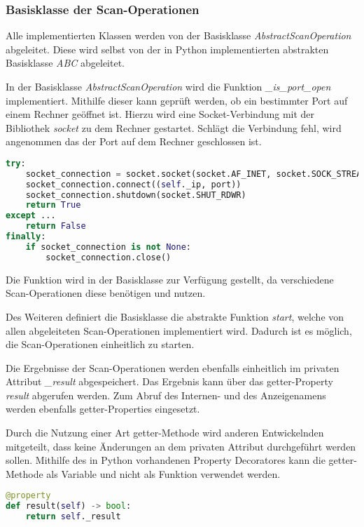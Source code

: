 \subsubsection{Basisklasse der Scan-Operationen}

Alle implementierten Klassen werden von der Basisklasse \textit{AbstractScanOperation} abgeleitet. Diese wird selbst von der in Python implementierten abstrakten Basisklasse \textit{ABC} abgeleitet.

In der Basisklasse \textit{AbstractScanOperation} wird die Funktion \textit{\_is\_port\_open} implementiert. Mithilfe dieser kann geprüft werden, ob ein bestimmter Port auf einem Rechner geöffnet ist. Hierzu wird eine Socket-Verbindung mit der Bibliothek \textit{socket} zu dem Rechner gestartet. Schlägt die Verbindung fehl, wird angenommen das der Port auf dem Rechner geschlossen ist.

\begin{lstlisting}[language=Python, frame=single, caption={Big Brother Funktion is\_port\_open}, captionpos=b, label={lst:bigbrother-port-open}]
try:
	socket_connection = socket.socket(socket.AF_INET, socket.SOCK_STREAM)
	socket_connection.connect((self._ip, port))
	socket_connection.shutdown(socket.SHUT_RDWR)
	return True
except ...
	return False
finally:
	if socket_connection is not None:
		socket_connection.close()
\end{lstlisting}

Die Funktion wird in der Basisklasse zur Verfügung gestellt, da verschiedene Scan-Operationen diese benötigen und nutzen.

Des Weiteren definiert die Basisklasse die abstrakte Funktion \textit{start}, welche von allen abgeleiteten Scan-Operationen implementiert wird. Dadurch ist es möglich, die Scan-Operationen einheitlich zu starten.

Die Ergebnisse der Scan-Operationen werden ebenfalls einheitlich im privaten Attribut \textit{\_result} abgespeichert. Das Ergebnis kann über das getter-Property \textit{result} abgerufen werden. Zum Abruf des Internen- und des Anzeigenamens werden ebenfalls getter-Properties eingesetzt. 

Durch die Nutzung einer Art getter-Methode wird anderen Entwickelnden mitgeteilt, dass keine Änderungen an dem privaten Attribut durchgeführt werden sollen. Mithilfe des in Python vorhandenen Property Decoratores kann die getter-Methode als Variable und nicht als Funktion verwendet werden.

\begin{lstlisting}[language=Python, frame=single, caption={Big Brother Ergebnis Getter-Property}, captionpos=b, label={lst:bigbrother-getter-result}]
@property
def result(self) -> bool:
	return self._result
\end{lstlisting}


